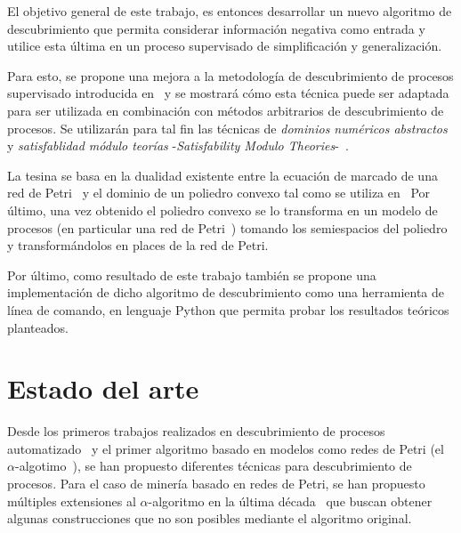 El objetivo general de este trabajo, es entonces desarrollar un nuevo algoritmo de descubrimiento que permita considerar
información negativa como entrada y utilice esta última en un proceso supervisado de simplificación y 
generalización. 

Para esto, se propone una mejora a la metodología de descubrimiento de procesos supervisado introducida en~\cite{LeonCB15}
y se mostrará cómo esta técnica puede ser adaptada para ser utilizada en combinación con métodos arbitrarios
de descubrimiento de procesos. Se utilizarán para tal fin las técnicas de
\textit{dominios numéricos abstractos}~\cite{Rockafellar70} y \textit{satisfablidad módulo teorías}
-\textit{Satisfability Modulo Theories}-~\cite{NieuwenhuisOT06}.

La tesina se basa en la dualidad existente entre la ecuación de marcado de una red de Petri~\cite{SilvaTC96}
y el dominio de un poliedro convexo tal como se utiliza en~\cite{CarmonaC14}
Por último, una vez obtenido el poliedro convexo se lo transforma en un modelo de
procesos (en particular una red de Petri~\cite{Murata89}) tomando los semiespacios del poliedro y
transformándolos en places de la red de Petri.

Por último, como resultado de este trabajo también se propone una implementación de dicho algoritmo de descubrimiento como una 
herramienta de línea de comando, en lenguaje Python que permita probar los resultados
teóricos planteados.

\section{Estado del arte}
\label{sec:esatdo_del_arte}

Desde los primeros trabajos realizados en descubrimiento de procesos automatizado~\cite{CookW98, AgrawalGL98} y el primer
algoritmo basado en modelos como redes de Petri (el $\alpha$-algotimo~\cite{AalstWM04}), se han propuesto diferentes
técnicas para descubrimiento de procesos. 
Para el caso de minería basado en redes de Petri, se han propuesto múltiples extensiones al
$\alpha$-algoritmo en la última década~\cite{MedeirosAW03,WenAWS07,GuoWWYY15} que buscan obtener algunas
construcciones que no son posibles mediante el algoritmo original.


